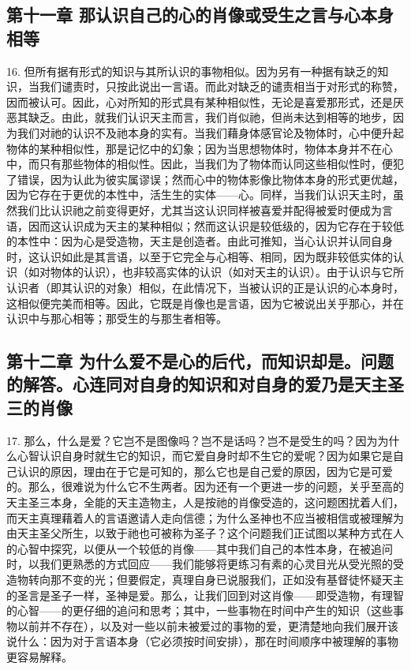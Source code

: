 
\subsection{第十一章 那认识自己的心的肖像或受生之言与心本身相等}

16. 但所有据有形式的知识与其所认识的事物相似。因为另有一种据有缺乏的知识，当我们谴责时，只按此说出一言语。而此对缺乏的谴责相当于对形式的称赞，因而被认可。因此，心对所知的形式具有某种相似性，无论是喜爱那形式，还是厌恶其缺乏。由此，就我们认识天主而言，我们肖似祂，但尚未达到相等的地步，因为我们对祂的认识不及祂本身的实有。当我们藉身体感官论及物体时，心中便升起物体的某种相似性，那是记忆中的幻象；因为当思想物体时，物体本身并不在心中，而只有那些物体的相似性。因此，当我们为了物体而认同这些相似性时，便犯了错误，因为认此为彼实属谬误；然而心中的物体影像比物体本身的形式更优越，因为它存在于更优的本性中，活生生的实体——心。同样，当我们认识天主时，虽然我们比认识祂之前变得更好，尤其当这认识同样被喜爱并配得被爱时便成为言语，因而这认识成为天主的某种相似；然而这认识是较低级的，因为它存在于较低的本性中：因为心是受造物，天主是创造者。由此可推知，当心认识并认同自身时，这认识如此是其言语，以至于它完全与心相等、相同，因为既非较低实体的认识（如对物体的认识），也非较高实体的认识（如对天主的认识）。由于认识与它所认识者（即其认识的对象）相似，在此情况下，当被认识的正是认识的心本身时，这相似便完美而相等。因此，它既是肖像也是言语，因为它被说出关乎那心，并在认识中与那心相等；那受生的与那生者相等。\par


\subsection{第十二章 为什么爱不是心的后代，而知识却是。问题的解答。心连同对自身的知识和对自身的爱乃是天主圣三的肖像}

17. 那么，什么是爱？它岂不是图像吗？岂不是话吗？岂不是受生的吗？因为为什么心智认识自身时就生它的知识，而它爱自身时却不生它的爱呢？因为如果它是自己认识的原因，理由在于它是可知的，那么它也是自己爱的原因，因为它是可爱的。那么，很难说为什么它不生两者。因为还有一个更进一步的问题，关乎至高的天主圣三本身，全能的天主造物主，人是按祂的肖像受造的，这问题困扰着人们，而天主真理藉着人的言语邀请人走向信德；为什么圣神也不应当被相信或被理解为由天主圣父所生，以致于祂也可被称为圣子？这个问题我们正试图以某种方式在人的心智中探究，以便从一个较低的肖像——其中我们自己的本性本身，在被追问时，以我们更熟悉的方式回应——我们能够将更练习有素的心灵目光从受光照的受造物转向那不变的光；但要假定，真理自身已说服我们，正如没有基督徒怀疑天主的圣言是圣子一样，圣神是爱。那么，让我们回到对这肖像——即受造物，有理智的心智——的更仔细的追问和思考；其中，一些事物在时间中产生的知识（这些事物以前并不存在），以及对一些以前未被爱过的事物的爱，更清楚地向我们展开该说什么：因为对于言语本身（它必须按时间安排），那在时间顺序中被理解的事物更容易解释。\par

